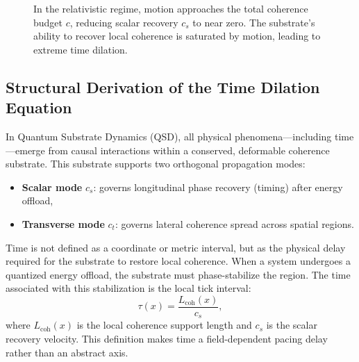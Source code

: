 \documentclass[entropy,article,submit,pdftex,moreauthors]{Definitions/mdpi}
\begin{document}
\begin{figure}[ht]
\centering
{}
\caption{In the relativistic regime, motion approaches the total coherence budget \( c \), reducing scalar recovery \( c_s \) to near zero. The substrate’s ability to recover local coherence is saturated by motion, leading to extreme time dilation.}
\label{fig:relativistic-triangle}
\end{figure}


\subsection{Structural Derivation of the Time Dilation Equation}

In Quantum Substrate Dynamics (QSD), all physical phenomena—including time—emerge from causal interactions within a conserved, deformable coherence substrate. This substrate supports two orthogonal propagation modes:

\begin{itemize}
  \item \textbf{Scalar mode} \( c_s \): governs longitudinal phase recovery (timing) after energy offload,
  \item \textbf{Transverse mode} \( c_t \): governs lateral coherence spread across spatial regions.
\end{itemize}

Time is not defined as a coordinate or metric interval, but as the physical delay required for the substrate to restore local coherence. When a system undergoes a quantized energy offload, the substrate must phase-stabilize the region. The time associated with this stabilization is the local tick interval:
\begin{equation}
\tau(x) = \frac{L_{\text{coh}}(x)}{c_s},
\end{equation}
where \( L_{\text{coh}}(x) \) is the local coherence support length and \( c_s \) is the scalar recovery velocity. This definition makes time a field-dependent pacing delay rather than an abstract axis.
\end{document}
